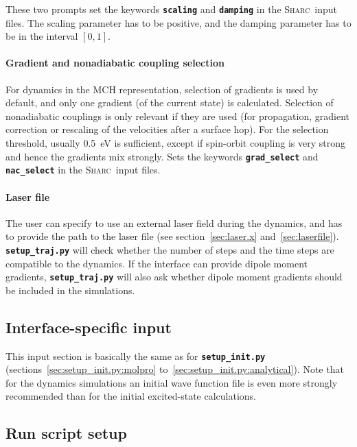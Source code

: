 \documentclass[a4paper,10pt,DIV=15,openany,twoside=false]{scrbook}
\newcommand{\sharc}{\textsc{Sharc}}
\newcommand{\todo}[1]{\textcolor{RL}{#1}}
\newcommand{\ttt}[1]{\textbf{\texttt{#1}}}
\begin{document}
These two prompts set the keywords \ttt{scaling} and \ttt{damping} in the \sharc\ input files. The scaling parameter has to be positive, and the damping parameter has to be in the interval $[0,1]$.

\paragraph{Gradient and nonadiabatic coupling selection}

For dynamics in the MCH representation, selection of gradients is used by default, and only one gradient (of the current state) is calculated. Selection of nonadiabatic couplings is only relevant if they are used (for propagation, gradient correction or rescaling of the velocities after a surface hop). For the selection threshold, usually 0.5~eV is sufficient, except if spin-orbit coupling is very strong and hence the gradients mix strongly.
Sets the keywords \ttt{grad\_select} and \ttt{nac\_select} in the \sharc\ input files.

\paragraph{Laser file}

The user can specify to use an external laser field during the dynamics, and has to provide the path to the laser file (see section~\ref{sec:laser.x} and~\ref{sec:laserfile}). \ttt{setup\_traj.py} will check whether the number of steps and the time steps are compatible to the dynamics. If the interface can provide dipole moment gradients, \ttt{setup\_traj.py} will also ask whether dipole moment gradients should be included in the simulations.

\subsection{Interface-specific input}

This input section is basically the same as for \ttt{setup\_init.py} (\todo{sections~\ref{sec:setup_init.py:molpro} to~\ref{sec:setup_init.py:analytical}}). Note that for the dynamics simulations an initial wave function file is even more strongly recommended than for the initial excited-state calculations.

\subsection{Run script setup}
\end{document}
